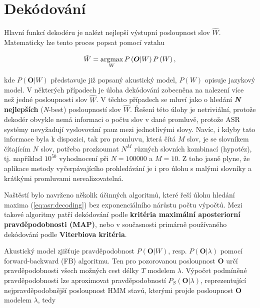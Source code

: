 \section{Dekódování}
\label{chap:asr:decoding}

Hlavní funkcí dekodéru je nalézt nejlepší výstupní posloupnost slov $\hat{W}$. Matematicky lze tento proces popsat pomocí vztahu

\begin{equation}
  \hat{W} = \operatorname*{argmax}_{W} P\left(\boldsymbol{O} | W\right)P\left(W\right),
  \label{eq:asr:decoding:decoder}
\end{equation}

\noindent kde $P\left(\boldsymbol{O}|W\right)$ představuje již popsaný akustický model, $P\left(W\right)$ opisuje jazykový model. V některých případech je úloha dekódování zobecněna na nalezení více než jedné posloupnosti slov $\hat{W}$. V těchto případech se mluví jako o hledání \textbf{\textit{N} nejlepších} (\textit{N}-best) posloupností slov $\hat{W}$.  Řešení této úlohy je netriviální, protože dekodér obvykle nemá informaci o počtu slov v dané promluvě, protože ASR systémy nevyžadují vyslovování pauz mezi jednotlivými slovy. Navíc, i kdyby tato informace byla k dispozici, tak pro promluvu, která čítá $M$ slov, je se slovníkem čítajícím $N$ slov, potřeba prozkoumat $N^{M}$ různých slovních kombinací (hypotéz), tj. například $10^{50}$ vyhodnocení při $N=100000$ a $M=10$. Z toho jasně plyne, že aplikace metody vyčerpávajícího prohledávání je i pro úlohu s malými slovníky a krátkými promluvami nerealizovatelná.

Naštěstí bylo navrženo několik účinných algoritmů, které řeší úlohu hledání maxima (\ref{eq:asr:decoding}) bez exponenciálního nárůstu počtu výpočtů. Mezi takové algoritmy patří dekódování podle \textbf{kritéria maximální aposteriorní pravděpodobnosti (MAP)}, nebo v současnosti primárně používaného dekódování podle \textbf{Viterbiova kritéria}.

Akustický model zjišťuje pravděpodobnost $P\left(\boldsymbol{O}|W\right)$, resp. $P\left(\boldsymbol{O}|\lambda\right)$ pomocí forward-backward (FB) algoritmu.
Ten pro pozorovanou posloupnost $\boldsymbol{O}$ určí pravděpodobnosti všech možných cest délky $T$ modelem $\lambda$.
Výpočet podmíněné pravděpodobnosti lze aproximovat pravděpodobností $P_S(\boldsymbol{O}|\lambda)$, reprezentující nejpravděpodobnější posloupnost HMM stavů, kterými projde posloupnost $\boldsymbol{O}$ modelem $\lambda$, tedy

